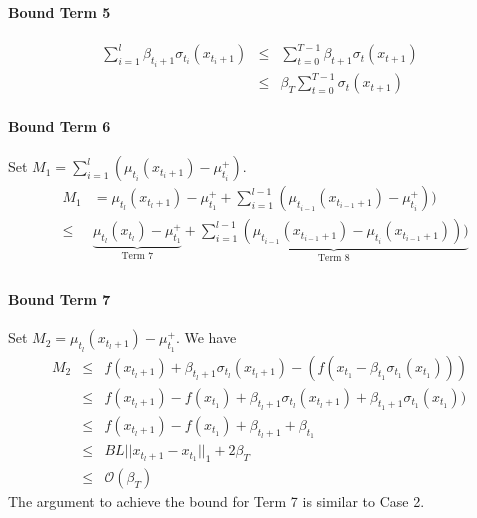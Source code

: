 \documentclass[twoside]{article}
\newenvironment{proof*}[1][\proofname]{
  \renewcommand\qedsymbol{\rule{2.5mm}{2.5mm}}
  \begin{proof}[#1]}{\end{proof}}
\begin{document}
\begin{proof*}
\paragraph{Bound Term 5}
\begin{eqnarray*}
\sum_{i = 1}^{l} \beta_{t_i+1} \sigma_{t_i}(x_{t_i +1}) & \le & \sum_{t=0}^{T-1} \beta_{t+1} \sigma_{t}(x_{t+1}) \\
& \le &  \beta_T \sum_{t=0}^{T-1} \sigma_{t}(x_{t+1})
\end{eqnarray*}
\paragraph{Bound Term 6} Set $M_1 = \sum_{i = 1}^{l}(\mu_{t_i}(x_{t_i +1}) - \mu_{t_i}^+)$.
\begin{eqnarray*}
& M_1 & =\mu_{t_l}(x_{t_l +1}) - \mu_{t_1}^+  + \sum_{i=1}^{l-1} (\mu_{t_{i-1}}(x_{t_{i-1} +1}) - \mu_{t_i}^+))\\
&\le & \underbrace{\mu_{t_l}(x_{t_l}) - \mu_{t_1}^+}_{\text{Term 7}}  + \underbrace{\sum_{i=1}^{l-1} (\mu_{t_{i-1}}(x_{t_{i-1} +1}) - \mu_{t_i}(x_{t_{i-1} +1})))}_{\text{Term 8}}\\
\end{eqnarray*}
\paragraph{Bound Term 7} Set $M_2 = \mu_{t_l}(x_{t_l+1}) - \mu_{t_1}^+ $. We have
\begin{eqnarray*}
M_2 & \le & f(x_{t_l + 1}) + \beta_{t_l+1}\sigma_{t_l}(x_{t_l+1}) - (f(x_{t_1} - \beta_{t_1}\sigma_{t_1}(x_{t_1}))) \\
& \le &  f(x_{t_l + 1}) - f(x_{t_1}) + \beta_{t_l+1}\sigma_{t_l}(x_{t_l+1})+ \beta_{t_1 +1}\sigma_{t_1}(x_{t_1})) \\
& \le & f(x_{t_l + 1}) - f(x_{t_1}) + \beta_{t_l +1}  + \beta_{t_1}  \\
& \le & BL||x_{t_l + 1} - x_{t_1}||_1 + 2\beta_T  \\
& \le & \mathcal O(\beta_T)
\end{eqnarray*}
The argument to achieve the bound for Term 7 is similar to Case 2.

\end{proof*}
\end{document}
